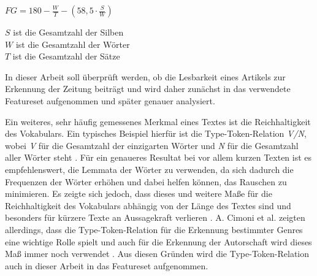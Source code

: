 \(FG = 180 - \frac{W}{T} - (58,5 \cdot \frac{S}{W})\)

$ S $ ist die Gesamtzahl der Silben\\
$ W $ ist die Gesamtzahl der Wörter\\
$ T $ ist die Gesamtzahl der Sätze


In dieser Arbeit soll überprüft werden, ob die Lesbarkeit eines Artikels zur Erkennung der Zeitung beiträgt und wird daher zunächst in das verwendete Featureset aufgenommen und später genauer analysiert.

Ein weiteres, sehr häufig gemessenes Merkmal eines Textes ist die Reichhaltigkeit des Vokabulars. Ein typisches Beispiel hierfür ist die Type-Token-Relation \textit{V/N}, wobei \textit{V} für die Gesamtzahl der einzigarten Wörter und \textit{N} für die Gesamtzahl aller Wörter steht \cite[S.~540]{stamatatos2009survey}. Für ein genaueres Resultat bei vor allem kurzen Texten ist es empfehlenswert, die Lemmata der Wörter zu verwenden, da sich dadurch die Frequenzen der Wörter erhöhen und dabei helfen können, das Rauschen zu minimieren. Es zeigte sich jedoch, dass dieses und weitere Maße für die Reichhaltigkeit des Vokabulars abhängig von der Länge des Textes sind und besonders für kürzere Texte an Aussagekraft verlieren \cite{tweedie1998variable}. A. Cimoni et al. zeigten allerdings, dass die Type-Token-Relation für die Erkennung bestimmter Genres eine wichtige Rolle spielt \cite[S.~5]{cimino2017identifying} und auch für die Erkennung der Autorschaft wird dieses Maß immer noch verwendet \cite[S.~540]{stamatatos2009survey}. Aus diesen Gründen wird die Type-Token-Relation auch in dieser Arbeit in das Featureset aufgenommen.

